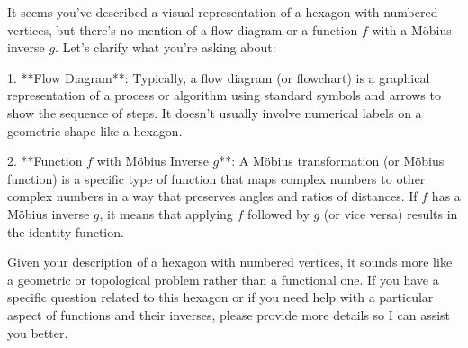 It seems you've described a visual representation of a hexagon with numbered vertices, but there's no mention of a flow diagram or a function \( f \) with a Möbius inverse \( g \). Let's clarify what you're asking about:

1. **Flow Diagram**: Typically, a flow diagram (or flowchart) is a graphical representation of a process or algorithm using standard symbols and arrows to show the sequence of steps. It doesn't usually involve numerical labels on a geometric shape like a hexagon.

2. **Function \( f \) with Möbius Inverse \( g \)**: A Möbius transformation (or Möbius function) is a specific type of function that maps complex numbers to other complex numbers in a way that preserves angles and ratios of distances. If \( f \) has a Möbius inverse \( g \), it means that applying \( f \) followed by \( g \) (or vice versa) results in the identity function.

Given your description of a hexagon with numbered vertices, it sounds more like a geometric or topological problem rather than a functional one. If you have a specific question related to this hexagon or if you need help with a particular aspect of functions and their inverses, please provide more details so I can assist you better.